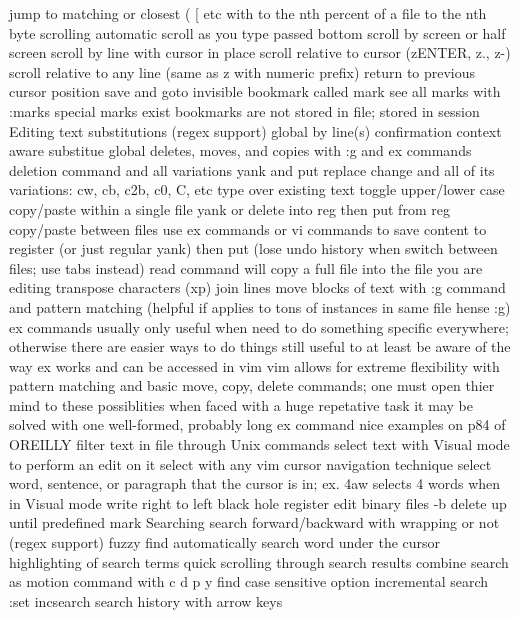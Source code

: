 \documentclass[12pt]{book}
\begin{document}
    jump to matching or closest ( { [ etc with %
    to the nth percent of a file 
    to the nth byte
  scrolling
    automatic scroll as you type passed bottom
    scroll by screen or half screen
    scroll by line with cursor in place
    scroll relative to cursor (zENTER, z., z-)
    scroll relative to any line (same as z with numeric prefix)
  return to previous cursor position
  save and goto invisible bookmark  called mark
    see all marks with :marks
    special marks exist
    bookmarks are not stored in file; stored in session
Editing text
  substitutions (regex support) 
    global
    by line(s)
    confirmation
    context aware substitue
  global deletes, moves, and copies with :g and ex commands
  deletion command and all variations
  yank and put
  replace
    change and all of its variations: cw, cb, c2b, c0, C, etc 
    type over existing text
  toggle upper/lower case
  copy/paste within a single file
    yank or delete into reg then put from reg
  copy/paste between files
    use ex commands or vi commands to save content to register (or just regular yank) then put (lose undo history when switch between files; use tabs instead)
    read command will copy a full file into the file you are editing
  transpose characters (xp)
  join lines
  move blocks of text
    with :g command and pattern matching (helpful if applies to tons of instances in same file hense :g)
  ex commands
    usually only useful when need to do something specific everywhere; otherwise there are easier ways to do things
    still useful to at least be aware of the way ex works and can be accessed in vim
    vim allows for extreme flexibility with pattern matching and basic move, copy, delete commands; one must open thier mind to these possiblities when faced with a huge repetative task
    it may be solved with one well-formed, probably long ex command
    nice examples on p84 of OREILLY
  filter text in file through Unix commands
  select text with Visual mode to perform an edit on it
    select with any vim cursor navigation technique
    select word, sentence, or paragraph that the cursor is in; ex. 4aw selects 4 words when in Visual mode
  write right to left
  black hole register
  edit binary files -b
  delete up until predefined mark
Searching
  search forward/backward with wrapping or not (regex support)
  fuzzy find
  automatically search word under the cursor
  highlighting of search terms
  quick scrolling through search results
  combine search as motion command with c d p y
  find
  case sensitive option
  incremental search :set incsearch
  search history with arrow keys
}
\end{document}
